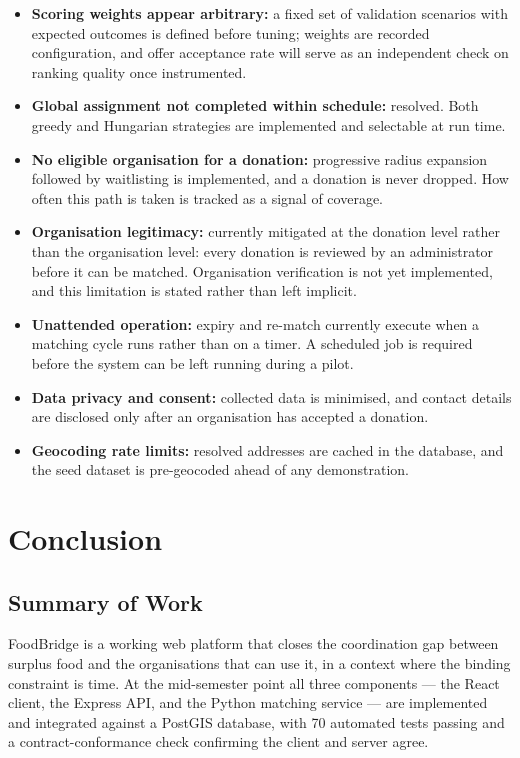 \documentclass[12pt,a4paper]{report}
\begin{document}
\begin{itemize}[leftmargin=*]
    \item \textbf{Scoring weights appear arbitrary:} a fixed set of validation scenarios with expected outcomes is defined before tuning; weights are recorded configuration, and offer acceptance rate will serve as an independent check on ranking quality once instrumented.
    \item \textbf{Global assignment not completed within schedule:} resolved. Both greedy and Hungarian strategies are implemented and selectable at run time.
    \item \textbf{No eligible organisation for a donation:} progressive radius expansion followed by waitlisting is implemented, and a donation is never dropped. How often this path is taken is tracked as a signal of coverage.
    \item \textbf{Organisation legitimacy:} currently mitigated at the donation level rather than the organisation level: every donation is reviewed by an administrator before it can be matched. Organisation verification is not yet implemented, and this limitation is stated rather than left implicit.
    \item \textbf{Unattended operation:} expiry and re-match currently execute when a matching cycle runs rather than on a timer. A scheduled job is required before the system can be left running during a pilot.
    \item \textbf{Data privacy and consent:} collected data is minimised, and contact details are disclosed only after an organisation has accepted a donation.
    \item \textbf{Geocoding rate limits:} resolved addresses are cached in the database, and the seed dataset is pre-geocoded ahead of any demonstration.
\end{itemize}

\chapter{Conclusion}

\section{Summary of Work}

FoodBridge is a working web platform that closes the coordination gap between surplus food and the organisations that can use it, in a context where the binding constraint is time. At the mid-semester point all three components --- the React client, the Express API, and the Python matching service --- are implemented and integrated against a PostGIS database, with 70 automated tests passing and a contract-conformance check confirming the client and server agree.
\end{document}
